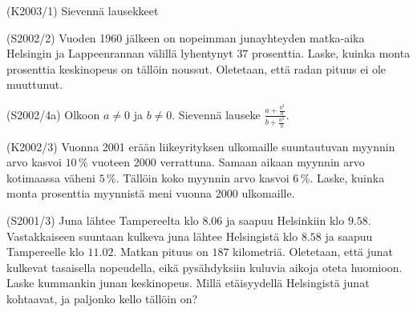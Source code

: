 \begin{multicols}{2}

\begin{tehtava}(K2003/1) Sievennä lausekkeet
\end{tehtava}

\begin{tehtava}(S2002/2) Vuoden 1960 jälkeen on nopeimman junayhteyden matka-aika Helsingin ja Lappeenrannan välillä lyhentynyt $37$ prosenttia. Laske, kuinka monta prosenttia keskinopeus on tällöin noussut. Oletetaan, että radan pituus ei ole muuttunut.
\end{tehtava}

\begin{tehtava}(S2002/4a) Olkoon $ a \neq 0$ ja $b \neq 0 $. Sievennä lauseke $\frac{a + \frac{b^2}{a} } {b + \frac{a^2}{b} }$.
\end{tehtava}

\begin{tehtava}(K2002/3) Vuonna 2001 erään liikeyrityksen ulkomaille suuntautuvan myynnin arvo kasvoi $10$\,\% vuoteen 2000 verrattuna. Samaan aikaan myynnin arvo kotimaassa väheni $5$\,\%. Tällöin koko myynnin arvo kasvoi $6$\,\%. Laske, kuinka monta prosenttia myynnistä meni vuonna 2000 ulkomaille.
\end{tehtava}


\begin{tehtava}(S2001/3) Juna lähtee Tampereelta klo $8.06$ ja saapuu Helsinkiin klo $9.58$. Vastakkaiseen suuntaan kulkeva juna lähtee Helsingistä klo $8.58$ ja saapuu Tampereelle klo $11.02$. Matkan pituus on $187$ kilometriä. Oletetaan, että junat kulkevat tasaisella nopeudella, eikä pysähdyksiin kuluvia aikoja oteta huomioon. Laske kummankin junan keskinopeus. Millä etäisyydellä Helsingistä junat kohtaavat, ja paljonko kello tällöin on? 
\end{tehtava}


\end{multicols}

